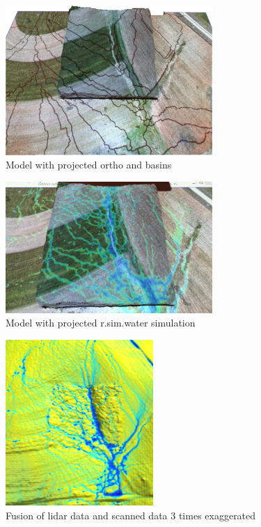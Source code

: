 \documentclass[a4paper,10pt]{article}
\begin{document}
\begin{figure}
\centering
 \includegraphics[width=0.7\textwidth]{img/model_ortho_all}
 \caption{Model with projected ortho and basins}
 \label{fig:model_ortho_all}
\end{figure}
\begin{figure}
\centering
 \includegraphics[width=0.7\textwidth]{img/flow1_detail}
 \caption{Model with projected r.sim.water simulation}
  \label{fig:flow1_detail}
\end{figure}

\begin{figure}
\centering
 \includegraphics[width=0.5\textwidth]{img/fusion}
 \caption{Fusion of lidar data and scanned data 3 times exaggerated}
  \label{fig:fusion}
\end{figure}
\end{document}
